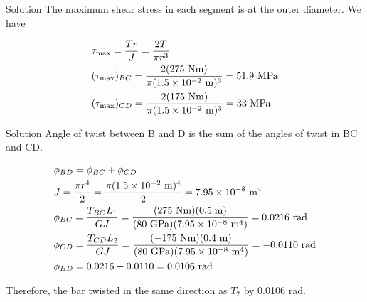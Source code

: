 \documentclass[10pt, svgnames]{beamer}
\begin{document}
\begin{frame}[label={sec:org4890679}]{Solution}
The maximum shear stress in each segment is at the outer diameter. We have

\begin{gather*}
  \tau _{\max} = \frac{Tr}{J} = \frac{2T}{\pi {r^3}} \hfill \\
  ({\tau_{\max }})_{BC} = \frac{2(275\text{ Nm})}{\pi {(1.5 \times 10^{-2}\text{ m})^3}} = 51.9\text{ MPa} \hfill \\
  ({\tau _{\max }})_{CD} = \frac{2(175\text{ Nm})}{\pi (1.5 \times 10^{-2}\text{ m})^3} = 33\text{ MPa} \hfill
\end{gather*}
\end{frame}

\begin{frame}[label={sec:orgedcbef6}]{Solution}
Angle of twist between B and D is the sum of the angles of twist in BC and CD.

\begin{gather*}
  \phi_{BD} = \phi_{BC} + \phi_{CD} \hfill \\
  J = \frac{\pi r^4}{2} = \frac{\pi (1.5 \times 10^{-2}\text{ m})^4}{2} = 7.95 \times 10^{-8}\text{ m}^4 \hfill \\
  \phi_{BC} = \frac{T_{BC}L_1}{GJ} = \frac{( 275\text{ Nm})(0.5\;{\text{m}})}{(80\text{ GPa})(7.95 \times 10^{-8}\text{ m}^4)} =  0.0216\text{ rad} \hfill \\
  \phi_{CD} = \frac{T_{CD}L_2}{GJ} = \frac{(-175\text{ Nm})(0.4\text{ m})}{(80\text{ GPa})(7.95 \times 10^{-8}\text{ m}^4)} = -0.0110\text{ rad} \hfill \\
  \phi_{BD} =  0.0216 - 0.0110 =  0.0106\text{ rad} \hfill \\
\end{gather*}

Therefore, the bar twisted in the same direction as \(T_2\) by 0.0106
rad.
\end{frame}
\end{document}
